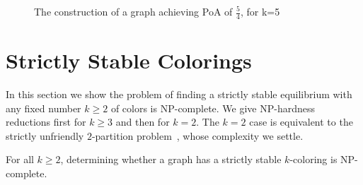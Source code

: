 \documentclass{llncs}
\begin{document}
\begin{figure}[htb]
\centering
{}
\caption{The construction of a graph achieving PoA of $\frac{5}{4}$, for k=5}
\label{fig:k5copies}
\end{figure}

\section{Strictly Stable Colorings}

In this section we show the problem of finding a strictly stable equilibrium
with any fixed number $k \geq 2$ of colors is NP-complete. 
We give NP-hardness reductions first for $k \geq 3$ and then for $k=2$.
The $k=2$ case is equivalent to the strictly unfriendly $2$-partition problem~\cite{ShafiqueD09},
whose complexity we settle.

\begin{theorem} 
For all $k \geq 2$, determining whether a graph has a strictly
stable $k$-coloring is NP-complete.  
\end{theorem}
\end{document}
